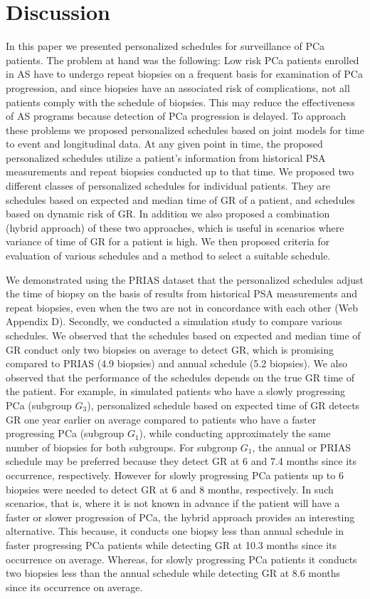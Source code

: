 
\section{Discussion}
\label{sec: discussion}
In this paper we presented personalized schedules for surveillance of PCa patients. The problem at hand was the following: Low risk PCa patients enrolled in AS have to undergo repeat biopsies on a frequent basis for examination of PCa progression, and since biopsies have an associated risk of complications, not all patients comply with the schedule of biopsies. This may reduce the effectiveness of AS programs because detection of PCa progression is delayed. To approach these problems we proposed personalized schedules based on joint models for time to event and longitudinal data. At any given point in time, the proposed personalized schedules utilize a patient's information from historical PSA measurements and repeat biopsies conducted up to that time. We proposed two different classes of personalized schedules for individual patients. They are schedules based on expected and median time of GR of a patient, and schedules based on dynamic risk of GR. In addition we also proposed a combination (hybrid approach) of these two approaches, which is useful in scenarios where variance of time of GR for a patient is high. We then proposed criteria for evaluation of various schedules and a method to select a suitable schedule.

We demonstrated using the PRIAS dataset that the personalized schedules adjust the time of biopsy on the basis of results from historical PSA measurements and repeat biopsies, even when the two are not in concordance with each other (Web Appendix D). Secondly, we conducted a simulation study to compare various schedules. We observed that the schedules based on expected and median time of GR conduct only two biopsies on average to detect GR, which is promising compared to PRIAS (4.9 biopsies) and annual schedule (5.2 biopsies). We also observed that the performance of the schedules depends on the true GR time of the patient. For example, in simulated patients who have a slowly progressing PCa (subgroup $G_3$), personalized schedule based on expected time of GR detects GR one year earlier on average compared to patients who have a faster progressing PCa (subgroup $G_1$), while conducting approximately the same number of biopsies for both subgroups. For subgroup $G_1$, the annual or PRIAS schedule may be preferred because they detect GR at 6 and 7.4 months since its occurrence, respectively. However for slowly progressing PCa patients up to 6 biopsies were needed to detect GR at 6 and 8 months, respectively. In such scenarios, that is, where it is not known in advance if the patient will have a faster or slower progression of PCa, the hybrid approach provides an interesting alternative. This because, it conducts one biopsy less than annual schedule in faster progressing PCa patients while detecting GR at 10.3 months since its occurrence on average. Whereas, for slowly progressing PCa patients it conducts two biopsies less than the annual schedule while detecting GR at 8.6 months since its occurrence on average.

